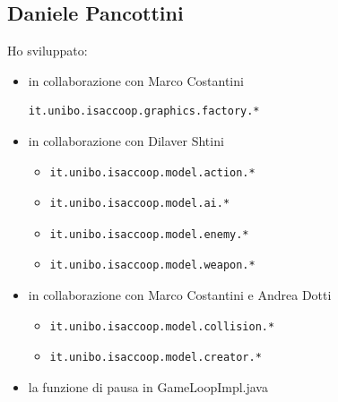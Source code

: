 \documentclass[a4paper,12pt]{report}
\begin{document}
\subsection*{Daniele Pancottini}
Ho sviluppato:
\begin{itemize}
    \item in collaborazione con Marco Costantini \begin{verbatim}it.unibo.isaccoop.graphics.factory.* \end{verbatim}
    \item in collaborazione con Dilaver Shtini
    \begin{itemize}
        \item \begin{verbatim}it.unibo.isaccoop.model.action.* \end{verbatim}
        \item \begin{verbatim}it.unibo.isaccoop.model.ai.* \end{verbatim}
        \item \begin{verbatim}it.unibo.isaccoop.model.enemy.* \end{verbatim}
        \item \begin{verbatim}it.unibo.isaccoop.model.weapon.* \end{verbatim}
    \end{itemize}
    \item in collaborazione con Marco Costantini e Andrea Dotti
    \begin{itemize}
        \item \begin{verbatim}it.unibo.isaccoop.model.collision.* \end{verbatim}
        \item \begin{verbatim}it.unibo.isaccoop.model.creator.* \end{verbatim}
    \end{itemize}
    \item la funzione di pausa in GameLoopImpl.java
\end{itemize}
\end{document}
